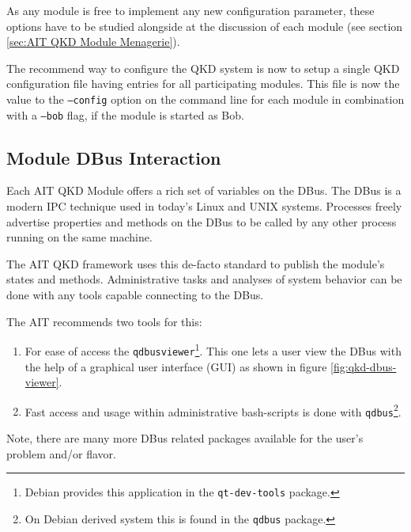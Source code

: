 \medskip

As any module is free to implement any new configuration parameter, these options have to be studied alongside at the discussion of each module (see section \ref{sec:AIT QKD Module Menagerie}).

\medskip

The recommend way to configure the QKD system is now to setup a single QKD configuration file having entries for all participating modules. This file is now the value to the \texttt{--config} option on the command line for each module in combination with a \texttt{--bob} flag, if the module is started as Bob.


\subsection{Module DBus Interaction}
\label{subsec:Module DBus Interaction}

Each AIT QKD Module offers a rich set of variables on the DBus. The DBus is a modern IPC technique used in today's Linux and UNIX systems. Processes freely advertise properties and methods on the DBus to be called by any other process running on the same machine.

\medskip

The AIT QKD framework uses this de-facto standard to publish the module's states and methods. Administrative tasks and analyses of system behavior can be done with any tools capable connecting to the DBus.

\medskip

The AIT recommends two tools for this:

\begin{enumerate}

\item For ease of access the \texttt{qdbusviewer}\footnote{Debian provides this application in the \texttt{qt-dev-tools} package.}. This one lets a user view the DBus with the help of a graphical user interface (GUI) as shown in figure \ref{fig:qkd-dbus-viewer}.

\item Fast access and usage within administrative bash-scripts is done with \texttt{qdbus}\footnote{On Debian derived system this is found in the \texttt{qdbus} package.}.

\end{enumerate}

\medskip

Note, there are many more DBus related packages available for the user's problem and/or flavor.

